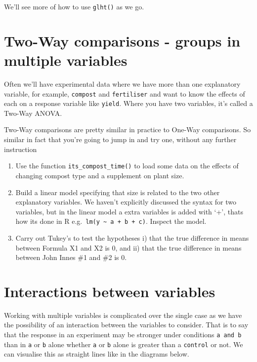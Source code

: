 \documentclass[
]{book}
\providecommand{\tightlist}{%
  \setlength{\itemsep}{0pt}\setlength{\parskip}{0pt}}
\newenvironment{task}
{ \begin{tcolorbox}[title=For you to do,title filled] }
{  \end{tcolorbox} }
\begin{document}
We'll see more of how to use \texttt{glht()} as we go.

\hypertarget{two-way-comparisons---groups-in-multiple-variables}{%
\section{Two-Way comparisons - groups in multiple variables}\label{two-way-comparisons---groups-in-multiple-variables}}

Often we'll have experimental data where we have more than one explanatory variable, for example, \texttt{compost} and \texttt{fertiliser} and want to know the effects of each on a response variable like \texttt{yield}. Where you have two variables, it's called a Two-Way ANOVA.

Two-Way comparisons are pretty similar in practice to One-Way comparisons. So similar in fact that you're going to jump in and try one, without any further instruction

\begin{task}
\begin{enumerate}
\def\labelenumi{\arabic{enumi}.}
\tightlist
\item
  Use the function \texttt{its\_compost\_time()} to load some data on the effects of changing compost type and a supplement on plant size.
\item
  Build a linear model specifying that size is related to the two other explanatory variables. We haven't explicitly discussed the syntax for two variables, but in the linear model a extra variables is added with `+', thats how its done in R e.g.~\texttt{lm(y\ \textasciitilde{}\ a\ +\ b\ +\ c)}. Inspect the model.
\item
  Carry out Tukey's to test the hypotheses i) that the true difference in means between Formula X1 and X2 is 0, and ii) that the true difference in means between John Innes \#1 and \#2 is 0.
\end{enumerate}
\end{task}

\hypertarget{interactions-between-variables}{%
\section{Interactions between variables}\label{interactions-between-variables}}

Working with multiple variables is complicated over the single case as we have the possibility of an interaction between the variables to consider. That is to say that the response in an experiment may be stronger under conditions \texttt{a\ and\ b} than in \texttt{a} or \texttt{b} alone whether \texttt{a} or \texttt{b} alone is greater than a \texttt{control} or not. We can visualise this as straight lines like in the diagrams below.
\end{document}
